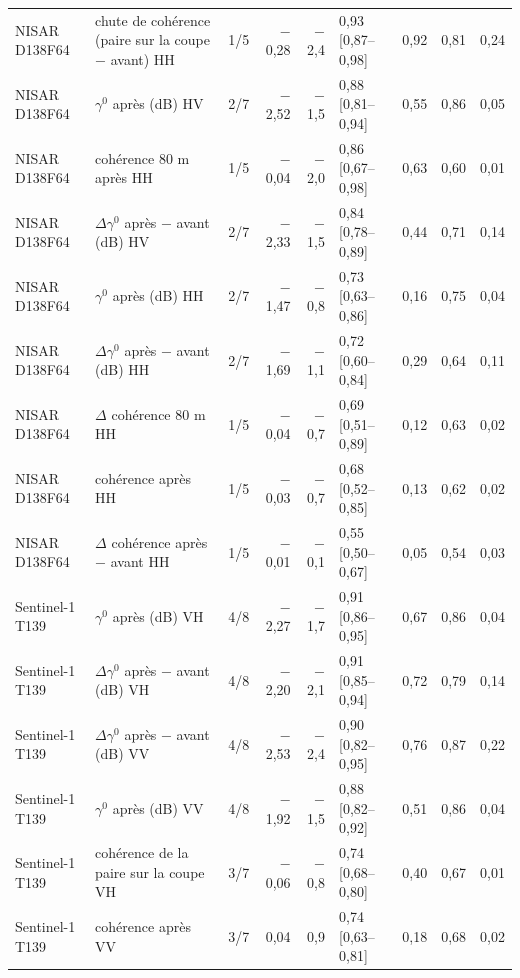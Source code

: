 \begin{table}[htbp]
\begin{tabular}{llcrrlrrr}
NISAR D138F64 & chute de cohérence (paire sur la coupe $-$ avant) HH & 1/5 & $-$0{,}28 & $-$2{,}4 & 0{,}93 [0{,}87--0{,}98] & 0{,}92 & 0{,}81 & 0{,}24 \\
NISAR D138F64 & $\gamma^0$ après (dB) HV & 2/7 & $-$2{,}52 & $-$1{,}5 & 0{,}88 [0{,}81--0{,}94] & 0{,}55 & 0{,}86 & 0{,}05 \\
NISAR D138F64 & cohérence 80 m après HH & 1/5 & $-$0{,}04 & $-$2{,}0 & 0{,}86 [0{,}67--0{,}98] & 0{,}63 & 0{,}60 & 0{,}01 \\
NISAR D138F64 & $\Delta\gamma^0$ après $-$ avant (dB) HV & 2/7 & $-$2{,}33 & $-$1{,}5 & 0{,}84 [0{,}78--0{,}89] & 0{,}44 & 0{,}71 & 0{,}14 \\
NISAR D138F64 & $\gamma^0$ après (dB) HH & 2/7 & $-$1{,}47 & $-$0{,}8 & 0{,}73 [0{,}63--0{,}86] & 0{,}16 & 0{,}75 & 0{,}04 \\
NISAR D138F64 & $\Delta\gamma^0$ après $-$ avant (dB) HH & 2/7 & $-$1{,}69 & $-$1{,}1 & 0{,}72 [0{,}60--0{,}84] & 0{,}29 & 0{,}64 & 0{,}11 \\
NISAR D138F64 & $\Delta$ cohérence 80 m HH & 1/5 & $-$0{,}04 & $-$0{,}7 & 0{,}69 [0{,}51--0{,}89] & 0{,}12 & 0{,}63 & 0{,}02 \\
NISAR D138F64 & cohérence après HH & 1/5 & $-$0{,}03 & $-$0{,}7 & 0{,}68 [0{,}52--0{,}85] & 0{,}13 & 0{,}62 & 0{,}02 \\
NISAR D138F64 & $\Delta$ cohérence après $-$ avant HH & 1/5 & $-$0{,}01 & $-$0{,}1 & 0{,}55 [0{,}50--0{,}67] & 0{,}05 & 0{,}54 & 0{,}03 \\
\addlinespace
Sentinel-1 T139 & $\gamma^0$ après (dB) VH & 4/8 & $-$2{,}27 & $-$1{,}7 & 0{,}91 [0{,}86--0{,}95] & 0{,}67 & 0{,}86 & 0{,}04 \\
Sentinel-1 T139 & $\Delta\gamma^0$ après $-$ avant (dB) VH & 4/8 & $-$2{,}20 & $-$2{,}1 & 0{,}91 [0{,}85--0{,}94] & 0{,}72 & 0{,}79 & 0{,}14 \\
Sentinel-1 T139 & $\Delta\gamma^0$ après $-$ avant (dB) VV & 4/8 & $-$2{,}53 & $-$2{,}4 & 0{,}90 [0{,}82--0{,}95] & 0{,}76 & 0{,}87 & 0{,}22 \\
Sentinel-1 T139 & $\gamma^0$ après (dB) VV & 4/8 & $-$1{,}92 & $-$1{,}5 & 0{,}88 [0{,}82--0{,}92] & 0{,}51 & 0{,}86 & 0{,}04 \\
Sentinel-1 T139 & cohérence de la paire sur la coupe VH & 3/7 & $-$0{,}06 & $-$0{,}8 & 0{,}74 [0{,}68--0{,}80] & 0{,}40 & 0{,}67 & 0{,}01 \\
Sentinel-1 T139 & cohérence après VV & 3/7 & 0{,}04 & 0{,}9 & 0{,}74 [0{,}63--0{,}81] & 0{,}18 & 0{,}68 & 0{,}02 \\

\end{tabular}
\end{table}
